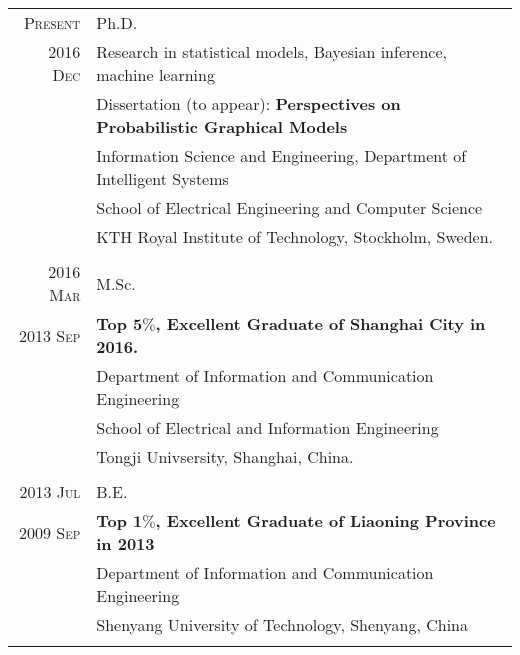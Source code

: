 \documentclass[a4paper,10pt]{article}
\begin{document}
\begin{tabular}{r|p{13cm}}

  \textsc{Present} 	& Ph.D. \\
  \textsc{2016 Dec} 	& {Research in statistical models, Bayesian inference, machine learning} \\
                    & {Dissertation (to appear): \textbf{Perspectives on Probabilistic Graphical Models}} \\
                    & { Information Science and Engineering, Department of Intelligent Systems
                      } \\
                    & {School of Electrical Engineering and Computer Science} \\
                    & {KTH Royal Institute of Technology, Stockholm, Sweden.} \\
  \multicolumn{2}{c}{} \\


  \textsc{2016 Mar} 	& M.Sc. \\
  \textsc{2013 Sep}  & \textbf{Top $\mathbf{5\%}$, Excellent Graduate of Shanghai City in 2016.}\\
                    & {Department of Information and Communication Engineering} \\
                    & {School of Electrical and Information Engineering} \\
                    & {Tongji Univsersity, Shanghai, China.}\\
  \multicolumn{2}{c}{} \\


  \textsc{2013 Jul} 	& B.E. \\
  \textsc{2009 Sep} & \textbf{Top $\mathbf{1\%}$, Excellent Graduate of Liaoning Province in 2013}\\
                    & {Department of Information and Communication Engineering}\\
                    & {Shenyang University of Technology, Shenyang, China} \\
  \multicolumn{2}{c}{}\\

\end{tabular}

\end{document}
